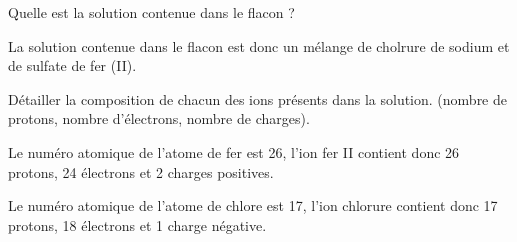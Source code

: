 \begin{questions}
	\question Quelle est la solution contenue dans le flacon ?
	\begin{solution}
		La solution contenue dans le flacon est donc un mélange de cholrure de sodium et de sulfate de fer (II).
	\end{solution}
	
	\question Détailler la composition de chacun des ions présents dans la solution. (nombre de protons, nombre d'électrons, nombre de charges).
	\begin{solution}
		Le numéro atomique de l'atome de fer est 26, l'ion fer II contient donc 26 protons, 24 électrons et 2 charges positives.
		
		Le numéro atomique de l'atome de chlore est 17, l'ion chlorure contient donc 17 protons, 18 électrons et 1 charge négative.
	\end{solution}
	
\end{questions}